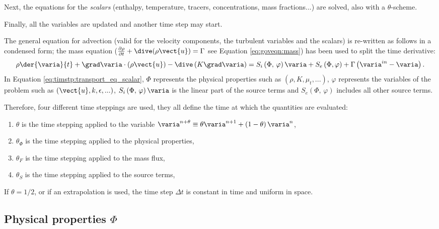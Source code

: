 Next, the equations for the \emph{scalars} (enthalpy, temperature, tracers,
concentrations, mass fractions...) are solved, also with a $\theta$-scheme.

Finally, all the variables are updated and another time step may start.

The general equation for advection (valid for the velocity components, the
turbulent variables and the scalars) is re-written as follows in a condensed
form; the mass equation ($\frac{\partial \rho } {\partial t}+ \dive(\rho
\vect{u}) = \Gamma$ see Equation \eqref{eq:goveqn:mass}) has been used to split the time derivative:
%
\begin{equation}\label{eq:timstp:transport_eq_scalar}
\rho \der{\varia}{t} + \grad \varia \cdot \left(\rho \vect{u} \right)
- \dive \left(K \grad \varia \right) = S_{i}\left(\Phi, \, \varphi\right) \varia + S_{e}\left(\Phi,\varphi \right)
+ \Gamma \left(\varia^{in} - \varia \right).
\end{equation}
In Equation \eqref{eq:timstp:transport_eq_scalar}, $\Phi$ represents the physical properties such as $(\rho,K,\mu_{t},...)$,
$\varphi$ represents the variables of the problem such as $(\vect{u},k,\epsilon,...)$,
$S_{i}\left(\Phi, \, \varphi \right) \varia$ is the linear part of the source terms
and
$S_{e} \left(\Phi, \, \varphi \right)$  includes all other source terms.

Therefore, four different time steppings are used, they all define the time at which the quantities are evaluated:
%
\begin{enumerate}[ label=\roman{*}/, ref=(\roman{*})]
\item $\theta$ is the time stepping applied to the variable $\varia^{n+\theta} \equiv \theta \varia^{n+1} + \left( 1 - \theta \right) \varia^n$,
\item $\theta_\Phi$ is the time stepping applied to the physical properties,
\item $\theta_F$ is the time stepping applied to the mass flux,
\item $\theta_S$ is the time stepping applied to the source terms,
\end{enumerate}
%

If $\theta=1/2$, or if an extrapolation is used, the time step $\Delta t$ is
constant in time and uniform in space.

\subsection{Physical properties $\Phi$}

